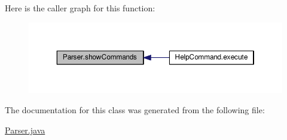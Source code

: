 Here is the caller graph for this function\-:
\nopagebreak
\begin{figure}[H]
\begin{center}
\leavevmode
\includegraphics[width=350pt]{classParser_a2510fee1c8d7298e222edaf1f34660dc_icgraph}
\end{center}
\end{figure}




The documentation for this class was generated from the following file\-:\begin{DoxyCompactItemize}
\item 
\hyperlink{Parser_8java}{Parser.\-java}\end{DoxyCompactItemize}
